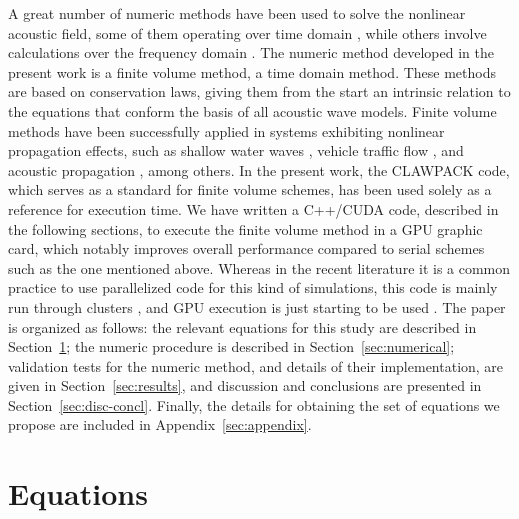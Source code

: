 A great number of numeric methods have been used to solve the nonlinear acoustic field, some of them operating over time domain \citep{karamalis, hallaj1999fdtd, okita2011development, pinton2009heterogeneous}, while others involve calculations over the frequency domain \citep{christopher1991new, albin, varray, varray2011fundamental, demi2011contrast}.  
The numeric method developed in the present work is a finite volume method, a time domain method. 
These methods are based on conservation laws, giving them from the start an intrinsic relation to the equations that conform the basis of all acoustic wave models. 
Finite volume methods have been successfully applied in systems exhibiting nonlinear propagation effects, such as 
shallow water waves \citep{rjl-george:catalina04}, 
vehicle traffic flow \citep{yi2003stability}, 
and acoustic propagation \citep{christov}, among others. 
In the present work, the CLAWPACK \citep{clawpack} code, which serves as a standard for finite volume schemes, has been used solely as a reference for execution time. We have written a C++/CUDA code, described in the following sections, to execute the finite volume method in a GPU graphic card, which notably improves overall performance compared to serial schemes such as the one mentioned above. 
Whereas in the recent literature it is a common practice to use parallelized code for this kind of simulations, this code is mainly run through clusters \citep{albin,  huijssen2010iterative, yuldashev2011simulation, okita2011development, varslot2006forward, pinton2009heterogeneous}, and GPU execution is just starting to be used \citep{varray, cudaclaw, karamalis}. 
The paper is organized as follows: 
the relevant equations for this study are described in Section~\ref{sec:equations}; the numeric procedure is described in Section~\ref{sec:numerical}; 
validation tests for the numeric method, and details of their implementation, are given in Section~\ref{sec:results}, 
and discussion and conclusions are presented in Section~\ref{sec:disc-concl}. 
Finally, the details for obtaining the set of equations we propose are included in Appendix~\ref{sec:appendix}.

\section{Equations}
\label{sec:equations}

